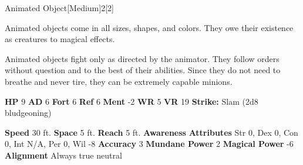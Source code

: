   
  \begin{monsection}{Animated Object}[Medium]{2}[2]
    \vspace{-1em}\vspace{-1em}
    \vspace{0em}

    
    Animated objects come in all sizes, shapes, and colors. They owe their existence as creatures to magical effects.

    Animated objects fight only as directed by the animator. They follow orders without question and to the best of their abilities. Since they do not need to breathe and never tire, they can be extremely capable minions.
  
    

    \begin{spellcontent}
      \begin{spelltargetinginfo}
        \pari \textbf{HP} 9 \monsep
          \textbf{AD} 6 \monsep
          \textbf{Fort} 6 \monsep
          \textbf{Ref} 6 \monsep
          \textbf{Ment} -2
        \pari \textbf{WR} 5 \monsep
        \textbf{VR} 19
        \pari \textbf{Strike:}
            Slam  (2d8 bludgeoning)
      \end{spelltargetinginfo}
    \end{spellcontent}
    \begin{monsterfooter}
      \pari \textbf{Speed} 30 ft. \monsep
        \textbf{Space} 5 ft. \monsep
        \textbf{Reach} 5 ft.
      \pari \textbf{Awareness} 
      \pari \textbf{Attributes}
        Str 0, Dex 0,
        Con 0, Int N/A,
        Per 0, Wil -8
      \pari \textbf{Accuracy} 3 \monsep
        \textbf{Mundane Power} 2 \monsep
      \textbf{Magical Power} -6
      \pari \textbf{Alignment} Always true neutral
    \end{monsterfooter}
  \end{monsection}
  
